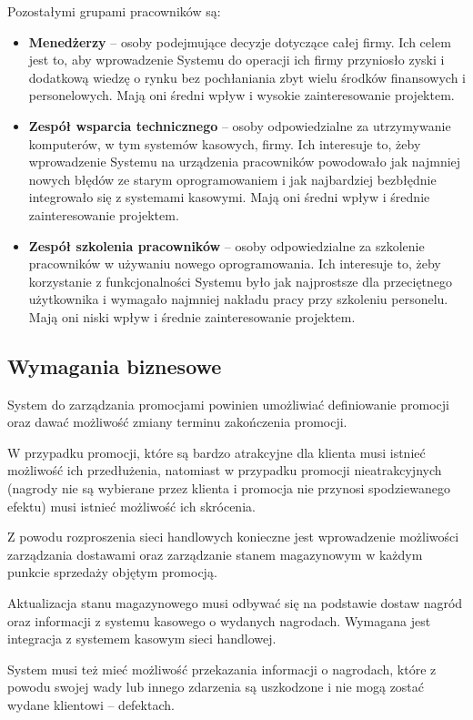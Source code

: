\documentclass[a4paper,12pt]{article}
\begin{document}
Pozostałymi grupami pracowników są:
\begin{itemize}
    \item \textbf{Menedżerzy} -- osoby podejmujące decyzje dotyczące całej firmy.
    Ich celem jest to, aby wprowadzenie Systemu do operacji ich firmy przyniosło zyski i dodatkową wiedzę o rynku bez pochłaniania zbyt wielu środków finansowych i personelowych.
    Mają oni średni wpływ i wysokie zainteresowanie projektem.
    \item \textbf{Zespół wsparcia technicznego} -- osoby odpowiedzialne za utrzymywanie komputerów, w tym systemów kasowych, firmy.
    Ich interesuje to, żeby wprowadzenie Systemu na urządzenia pracowników powodowało jak najmniej nowych błędów ze starym oprogramowaniem i jak najbardziej bezbłędnie integrowało się z systemami kasowymi.
    Mają oni średni wpływ i średnie zainteresowanie projektem.
    \item \textbf{Zespół szkolenia pracowników} -- osoby odpowiedzialne za szkolenie pracowników w używaniu nowego oprogramowania.
    Ich interesuje to, żeby korzystanie z funkcjonalności Systemu było jak najprostsze dla przeciętnego użytkownika i wymagało najmniej nakładu pracy przy szkoleniu personelu.
    Mają oni niski wpływ i średnie zainteresowanie projektem.
\end{itemize}

\subsection{Wymagania biznesowe}

System do zarządzania promocjami powinien umożliwiać definiowanie promocji oraz dawać możliwość zmiany terminu zakończenia promocji.

W przypadku promocji, które są bardzo atrakcyjne dla klienta musi istnieć możliwość ich przedłużenia, natomiast w przypadku promocji nieatrakcyjnych (nagrody nie są wybierane przez klienta i promocja nie przynosi spodziewanego efektu) musi istnieć możliwość ich skrócenia.

Z powodu rozproszenia sieci handlowych konieczne jest wprowadzenie możliwości zarządzania dostawami oraz zarządzanie stanem magazynowym w każdym punkcie sprzedaży objętym promocją.

Aktualizacja stanu magazynowego musi odbywać się na podstawie dostaw nagród oraz informacji z systemu kasowego o wydanych nagrodach.
Wymagana jest integracja z systemem kasowym sieci handlowej.

System musi też mieć możliwość przekazania informacji o nagrodach, które z powodu swojej wady lub innego zdarzenia są uszkodzone i nie mogą zostać wydane klientowi -- defektach.
\end{document}
